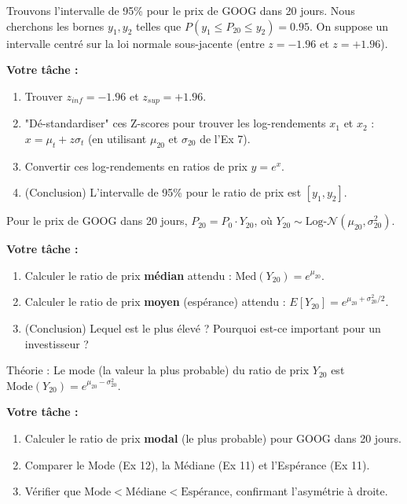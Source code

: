 \begin{exercicebox}
Trouvons l'intervalle de 95\% pour le prix de GOOG dans 20 jours.
Nous cherchons les bornes $y_1, y_2$ telles que $P(y_1 \le P_{20} \le y_2) = 0.95$.
On suppose un intervalle centré sur la loi normale sous-jacente (entre $z=-1.96$ et $z=+1.96$).

\textbf{Votre tâche :}
\begin{enumerate}
    \item Trouver $z_{inf} = -1.96$ et $z_{sup} = +1.96$.
    \item "Dé-standardiser" ces Z-scores pour trouver les log-rendements $x_1$ et $x_2$ :
        $x = \mu_t + z \sigma_t$ (en utilisant $\mu_{20}$ et $\sigma_{20}$ de l'Ex 7).
    \item Convertir ces log-rendements en ratios de prix $y = e^x$.
    \item (Conclusion) L'intervalle de 95\% pour le ratio de prix est $[y_1, y_2]$.
\end{enumerate}
\end{exercicebox}

\begin{exercicebox}
Pour le prix de GOOG dans 20 jours, $P_{20} = P_0 \cdot Y_{20}$, où $Y_{20} \sim \text{Log-}\mathcal{N}(\mu_{20}, \sigma_{20}^2)$.

\textbf{Votre tâche :}
\begin{enumerate}
    \item Calculer le ratio de prix \textbf{médian} attendu : $\text{Med}(Y_{20}) = e^{\mu_{20}}$.
    \item Calculer le ratio de prix \textbf{moyen} (espérance) attendu : $E[Y_{20}] = e^{\mu_{20} + \sigma_{20}^2 / 2}$.
    \item (Conclusion) Lequel est le plus élevé ? Pourquoi est-ce important pour un investisseur ?
\end{enumerate}
\end{exercicebox}

\begin{exercicebox}
Théorie : Le mode (la valeur la plus probable) du ratio de prix $Y_{20}$ est $\text{Mode}(Y_{20}) = e^{\mu_{20} - \sigma_{20}^2}$.

\textbf{Votre tâche :}
\begin{enumerate}
    \item Calculer le ratio de prix \textbf{modal} (le plus probable) pour GOOG dans 20 jours.
    \item Comparer le Mode (Ex 12), la Médiane (Ex 11) et l'Espérance (Ex 11).
    \item Vérifier que $\text{Mode} < \text{Médiane} < \text{Espérance}$, confirmant l'asymétrie à droite.
\end{enumerate}
\end{exercicebox}